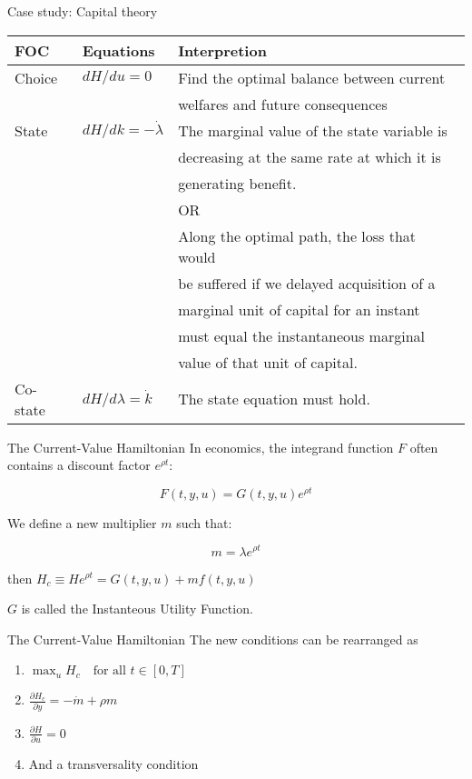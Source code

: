\documentclass[10pt]{beamer}
\begin{document}
\begin{frame}[label={sec:org378768d}]{Case study: Capital theory}
\begin{center}
\begin{tabular}{lll}
\hline
\alert{FOC} & \alert{Equations} & \alert{Interpretion}\\
\hline
Choice & \(dH/du =0\) & Find the optimal balance between current\\
 &  & welfares and future consequences\\
\hline
State & \(dH/dk = -\dot{\lambda}\) & The marginal value of the state variable is\\
 &  & decreasing at the same rate at which it is\\
 &  & generating benefit.\\
 &  & OR\\
 &  & Along the optimal path, the loss that would\\
 &  & be suffered if we delayed acquisition of a\\
 &  & marginal unit of capital for an instant\\
 &  & must equal the instantaneous marginal\\
 &  & value of that unit of capital.\\
\hline
Co-state & \(dH/d\lambda = \dot{k}\) & The state equation must hold.\\
\hline
\end{tabular}
\end{center}
\end{frame}

\begin{frame}[label={sec:orgd27020f}]{The Current-Value Hamiltonian}
In economics, the integrand function \(F\) often contains a \alert{discount factor} \(e^{\rho t}\):

$$
F(t,y,u) = G(t,y,u)e^{\rho t}
$$

We define a new multiplier \(m\) such that:

$$
m = \lambda e^{\rho t}
$$

then \(H_c \equiv He^{\rho t} = G(t, y, u) + mf(t,y,u)\)

\(G\) is called the \alert{Instanteous Utility Function}.
\end{frame}

\begin{frame}[label={sec:org7419a8c}]{The Current-Value Hamiltonian}
The new conditions can be rearranged as

\begin{enumerate}
\item \(\max_{u} H_c \quad \text{for all } t \in [0, T]\)
\item \(\frac{\partial H_c}{\partial y} = - \dot{m} + \rho m\)
\item \(\frac{\partial H}{\partial u} = 0\)
\item And a transversality condition
\end{enumerate}
\end{frame}
\end{document}
